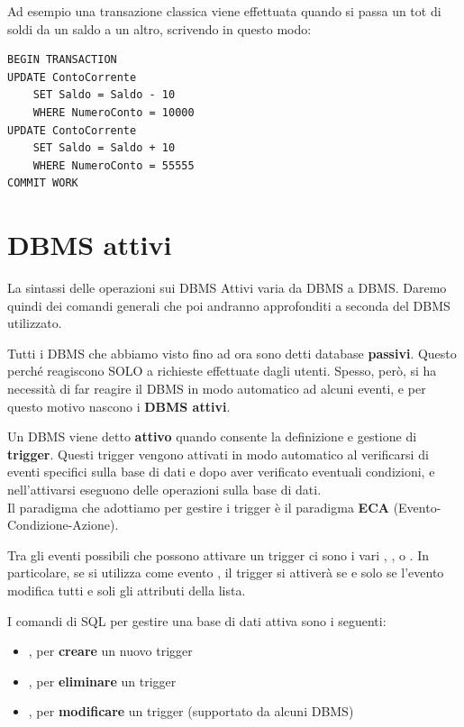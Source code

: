 \documentclass[11pt, a4paper, titlepage, oneside]{scrbook}
\begin{document}
Ad esempio una transazione classica viene effettuata quando si passa un tot di soldi da un saldo a un altro, scrivendo in questo modo:

\begin{lstlisting}
BEGIN TRANSACTION
UPDATE ContoCorrente
    SET Saldo = Saldo - 10
    WHERE NumeroConto = 10000
UPDATE ContoCorrente
    SET Saldo = Saldo + 10
    WHERE NumeroConto = 55555
COMMIT WORK
\end{lstlisting}


\section{DBMS attivi}

\NB La sintassi delle operazioni sui DBMS Attivi varia da DBMS a DBMS. Daremo quindi dei comandi generali che poi andranno approfonditi a seconda del DBMS utilizzato.

Tutti i DBMS che abbiamo visto fino ad ora sono detti database \textbf{passivi}. Questo perché reagiscono SOLO a richieste effettuate dagli utenti. Spesso, però, si ha necessità di far reagire il DBMS in modo automatico ad alcuni eventi, e per questo motivo nascono i \textbf{DBMS attivi}.

\begin{Definizione}
\label{def-DBMS attivo}
Un DBMS viene detto \textbf{attivo} quando consente la definizione e gestione di \textbf{trigger}. Questi trigger vengono attivati in modo automatico al verificarsi di eventi specifici sulla base di dati e dopo aver verificato eventuali condizioni, e nell'attivarsi eseguono delle operazioni sulla base di dati. \\
Il paradigma che adottiamo per gestire i trigger è il paradigma \textbf{ECA} (Evento-Condizione-Azione). 
\end{Definizione}

Tra gli eventi possibili che possono attivare un trigger ci sono i vari , ,  o . In particolare, se si utilizza come evento , il trigger si attiverà se e solo se l'evento modifica tutti e soli gli attributi della lista. 

I comandi di SQL per gestire una base di dati attiva sono i seguenti:
\begin{itemize}
    \item {}, per \textbf{creare} un nuovo trigger
    \item {}, per \textbf{eliminare} un trigger
    \item {}, per \textbf{modificare} un trigger (supportato da alcuni DBMS)
\end{itemize}
\end{document}
